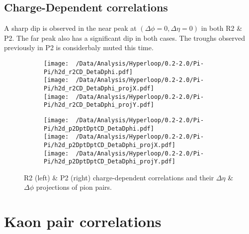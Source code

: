 \documentclass[12pt,a4paper,twoside]{report}
\begin{document}
\subsection{Charge-Dependent correlations}
A sharp dip is observed in the near peak at $(\Delta\phi=0,\Delta\eta=0)$ in both R2 \& P2. The far peak also has a significant dip in both cases. The troughs observed previously in P2 is considerbaly muted this time.
\begin{figure}[H]
	\begin{subfigure}{0.49\linewidth}
		\texttt{[image: ~/Data/Analysis/Hyperloop/0.2-2.0/Pi-Pi/h2d\_r2CD\_DetaDphi.pdf]}\\
		\texttt{[image: ~/Data/Analysis/Hyperloop/0.2-2.0/Pi-Pi/h2d\_r2CD\_DetaDphi\_projX.pdf]}\\
		\texttt{[image: ~/Data/Analysis/Hyperloop/0.2-2.0/Pi-Pi/h2d\_r2CD\_DetaDphi\_projY.pdf]}\\
	\end{subfigure}
	\begin{subfigure}{0.49\linewidth}
		\texttt{[image: ~/Data/Analysis/Hyperloop/0.2-2.0/Pi-Pi/h2d\_p2DptDptCD\_DetaDphi.pdf]}\\
		\texttt{[image: ~/Data/Analysis/Hyperloop/0.2-2.0/Pi-Pi/h2d\_p2DptDptCD\_DetaDphi\_projX.pdf]}\\
		\texttt{[image: ~/Data/Analysis/Hyperloop/0.2-2.0/Pi-Pi/h2d\_p2DptDptCD\_DetaDphi\_projY.pdf]}\\
	\end{subfigure}
	\caption{R2 (left) \& P2 (right) charge-dependent correlations and their $\Delta\eta$ \& $\Delta\phi$ projections of pion pairs.}
\end{figure}
\section{Kaon pair correlations}
\end{document}

